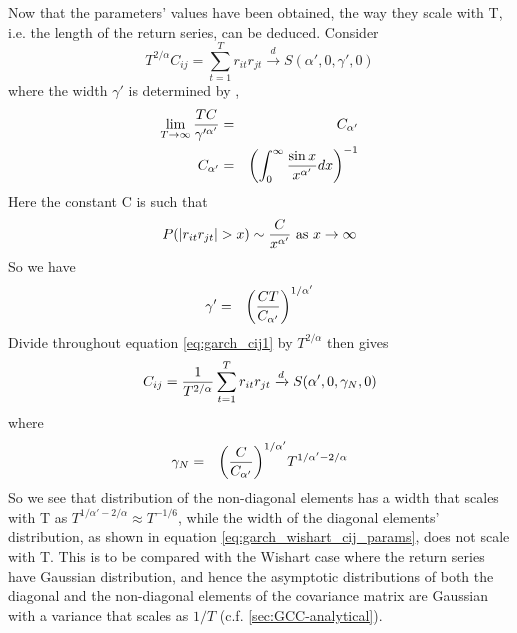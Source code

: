 Now that the parameters' values have been obtained, the way they scale
with T, i.e. the length of the return series, can be deduced. Consider
\begin{equation}\label{eq:garch_cij1}
  T^{2/\alpha} C_{ij} = \sum_{t=1}^T r_{it} r_{jt} \xrightarrow{d} S(\alpha',
  0, \gamma', 0)
\end{equation}
where the width $\gamma'$ is determined by \cite{Bilik2008},
\begin{eqnarray*}
  \lim_{T\to\infty} {T C \over \gamma'^{\alpha'}}
  &=& C_{\alpha'} \\
  C_{\alpha'} &=& \left( \int_0^\infty {\sin x \over x^{\alpha'}} dx
  \right)^{-1} \\
\end{eqnarray*}
Here the constant C is such that
\begin{equation*}
  P(|r_{it}r_{jt}| > x) \sim {C \over x^{\alpha'}} \text{ as $x \to \infty$}
\end{equation*}
So we have
\begin{eqnarray*}
  \gamma' &=& {\left( CT \over C_{\alpha'}\right)^{1/\alpha'}}
\end{eqnarray*}
Divide throughout equation \ref{eq:garch_cij1} by $T^{2/\alpha}$ then
gives
\begin{equation}\label{eq:garch_cij2}
  C_{ij} = {1 \over T^{2/\alpha}}\sum_{t=1}^T r_{it} r_{jt}
  \xrightarrow{d}
  S(\alpha', 0, \gamma_N, 0)
\end{equation}
where
\begin{eqnarray*}
  \gamma_N &=& {\left(C \over C_{\alpha'}\right)^{1/\alpha'}}
  T^{1/\alpha'-2/\alpha} \\
\end{eqnarray*}
So we see that distribution of the non-diagonal elements has a width
that scales with T as $T^{1/\alpha' - 2/\alpha} \approx T^{-1/6}$,
while the width of the diagonal elements' distribution, as shown in
equation \ref{eq:garch_wishart_cij_params}, does not scale with
T. This is to be compared with the Wishart case where the return
series have Gaussian distribution, and hence the asymptotic
distributions of both the diagonal and the non-diagonal elements of the
covariance matrix are Gaussian with a variance that scales as $1/T$
(c.f. \ref{sec:GCC-analytical}).


